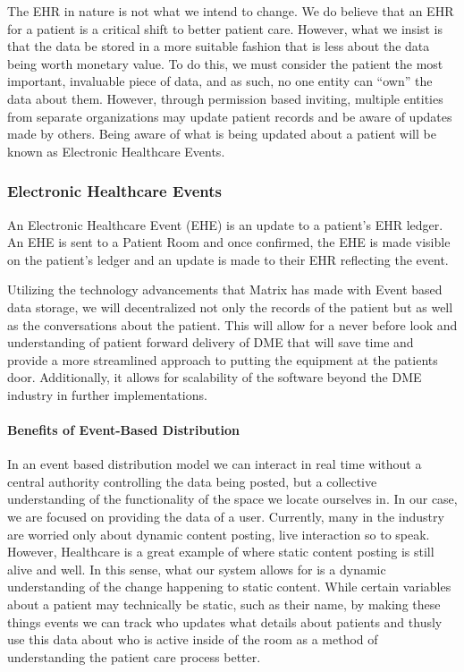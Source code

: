 \documentclass[12pt]{article}
\begin{document}
  The EHR in nature is not what we intend to change. We do believe that an EHR for a patient is a critical shift to better patient care. However, what we insist is that the data be stored in a more suitable fashion that is less about the data being worth monetary value. To do this, we must consider the patient the most important, invaluable piece of data, and as such, no one entity can “own” the data about them. However, through permission based inviting, multiple entities from separate organizations may update patient records and be aware of updates made by others. Being aware of what is being updated about a patient will be known as Electronic Healthcare Events.

    \subsubsection{Electronic Healthcare Events}
    An Electronic Healthcare Event (EHE) is an update to a patient’s EHR ledger. An EHE is sent to a Patient Room and once confirmed, the EHE is made visible on the patient’s ledger and an update is made to their EHR reflecting the event.

    Utilizing the technology advancements that Matrix has made with Event based data storage, we will decentralized not only the records of the patient but as well as the conversations about the patient. This will allow for a never before look and understanding of patient forward delivery of DME that will save time and provide a more streamlined approach to putting the equipment at the patients door. Additionally, it allows for scalability of the software beyond the DME industry in further implementations.

      \paragraph{Benefits of Event-Based Distribution}
      In an event based distribution model we can interact in real time without a central authority controlling the data being posted, but a collective understanding of the functionality of the space we locate ourselves in. In our case, we are focused on providing the data of a user. Currently, many in the industry are worried only about dynamic content posting, live interaction so to speak. However, Healthcare is a great example of where static content posting is still alive and well. In this sense, what our system allows for is a dynamic understanding of the change happening to static content. While certain variables about a patient may technically be static, such as their name, by making these things events we can track who updates what details about patients and thusly use this data about who is active inside of the room as a method of understanding the patient care process better.
\end{document}
